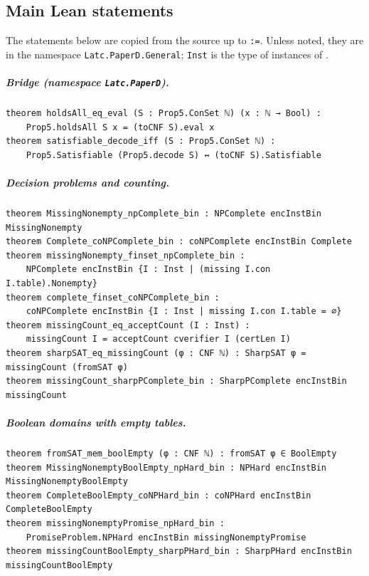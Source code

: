 \documentclass[pdflatex,sn-mathphys-num]{sn-jnl}
\theoremstyle{thmstyleone}
\theoremstyle{thmstylethree}
\begin{document}
\begin{appendices}

\section{Main Lean statements}
\label{app:statements}

The statements below are copied from the source up to \lstinline{:=}. Unless noted, they are in
the namespace \lstinline{Latc.PaperD.General}; \lstinline{Inst} is the type of instances of
.

\subparagraph*{Bridge (namespace \lstinline{Latc.PaperD}).}
\begin{lstlisting}
theorem holdsAll_eq_eval (S : Prop5.ConSet ℕ) (x : ℕ → Bool) :
    Prop5.holdsAll S x = (toCNF S).eval x
theorem satisfiable_decode_iff (S : Prop5.ConSet ℕ) :
    Prop5.Satisfiable (Prop5.decode S) ↔ (toCNF S).Satisfiable
\end{lstlisting}

\subparagraph*{Decision problems and counting.}
\begin{lstlisting}
theorem MissingNonempty_npComplete_bin : NPComplete encInstBin MissingNonempty
theorem Complete_coNPComplete_bin : coNPComplete encInstBin Complete
theorem missingNonempty_finset_npComplete_bin :
    NPComplete encInstBin {I : Inst | (missing I.con I.table).Nonempty}
theorem complete_finset_coNPComplete_bin :
    coNPComplete encInstBin {I : Inst | missing I.con I.table = ∅}
theorem missingCount_eq_acceptCount (I : Inst) :
    missingCount I = acceptCount cverifier I (certLen I)
theorem sharpSAT_eq_missingCount (φ : CNF ℕ) : SharpSAT φ = missingCount (fromSAT φ)
theorem missingCount_sharpPComplete_bin : SharpPComplete encInstBin missingCount
\end{lstlisting}

\subparagraph*{Boolean domains with empty tables.}
\begin{lstlisting}
theorem fromSAT_mem_boolEmpty (φ : CNF ℕ) : fromSAT φ ∈ BoolEmpty
theorem MissingNonemptyBoolEmpty_npHard_bin : NPHard encInstBin MissingNonemptyBoolEmpty
theorem CompleteBoolEmpty_coNPHard_bin : coNPHard encInstBin CompleteBoolEmpty
theorem missingNonemptyPromise_npHard_bin :
    PromiseProblem.NPHard encInstBin missingNonemptyPromise
theorem missingCountBoolEmpty_sharpPHard_bin : SharpPHard encInstBin missingCountBoolEmpty
\end{lstlisting}


\end{appendices}
\end{document}
